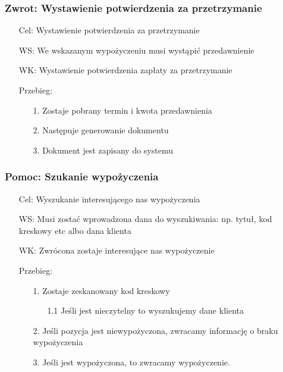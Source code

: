 \documentclass{article}
\begin{document}
\subsubsection{Zwrot: Wystawienie potwierdzenia za przetrzymanie}
	\begin{enumerate}
		\item[Cel:] Wystawienie potwierdzenia za przetrzymanie
		\item[WS:] We wskazanym wypożyczeniu musi wystąpić przedawnienie
		\item[WK:] Wystawienie potwierdzenia zapłaty za przetrzymanie
		\item[Przebieg:]
	\begin{enumerate}
		\item [1.]Zostaje pobrany termin i kwota przedawnienia 
		\item [2.]Następuje generowanie dokumentu
		\item [3.]Dokument jest zapisany do systemu
	\end{enumerate}
	\end{enumerate}
	
\subsubsection{Pomoc: Szukanie wypożyczenia}
\begin{enumerate}
	\item[Cel:] Wyszukanie interesującego nas wypożyczenia
	\item[WS:] Musi zostać wprowadzona dana do wyszukiwania: np. tytuł, kod kreskowy etc albo dana klienta
	\item[WK:] Zwrócona zostaje interesujące nas wypożyczenie
	\item[Przebieg:]
\begin{enumerate}
	\item [1.]Zostaje zeskanowany kod kreskowy 
	\begin{enumerate}
		\item [1.1] Jeśli jest nieczytelny to wyszukujemy dane klienta
	\end{enumerate}
	\item [2.]Jeśli pozycja jest niewypożyczona, zwracamy informację o braku wypożyczenia
	\item [3.]Jeśli jest wypożyczona, to zwracamy wypożyczenie.
\end{enumerate}
\end{enumerate}
\end{document}
